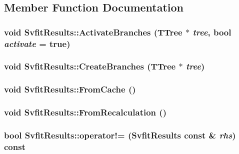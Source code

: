 \subsection{Member Function Documentation}
\hypertarget{classSvfitResults_aa0a9d6018105c2c242239e66d0af4a51}{
\subsubsection[{ActivateBranches}]{\setlength{\rightskip}{0pt plus 5cm}void SvfitResults::ActivateBranches (TTree $\ast$ {\em tree}, \/  bool {\em activate} = {\ttfamily true})}}
\label{classSvfitResults_aa0a9d6018105c2c242239e66d0af4a51}
\hypertarget{classSvfitResults_ad4822dc697bd45db7b7aa76c00ebd8e1}{
\subsubsection[{CreateBranches}]{\setlength{\rightskip}{0pt plus 5cm}void SvfitResults::CreateBranches (TTree $\ast$ {\em tree})}}
\label{classSvfitResults_ad4822dc697bd45db7b7aa76c00ebd8e1}
\hypertarget{classSvfitResults_aa2dfd4bb75cdb81445d4a7f12ff13765}{
\subsubsection[{FromCache}]{\setlength{\rightskip}{0pt plus 5cm}void SvfitResults::FromCache ()}}
\label{classSvfitResults_aa2dfd4bb75cdb81445d4a7f12ff13765}
\hypertarget{classSvfitResults_a57b084ba9986fcfe3709ae0f28c0d418}{
\subsubsection[{FromRecalculation}]{\setlength{\rightskip}{0pt plus 5cm}void SvfitResults::FromRecalculation ()}}
\label{classSvfitResults_a57b084ba9986fcfe3709ae0f28c0d418}
\hypertarget{classSvfitResults_ad041804809054ef7c2646c60917ba4df}{
\subsubsection[{operator!=}]{\setlength{\rightskip}{0pt plus 5cm}bool SvfitResults::operator!= ({\bf SvfitResults} const \& {\em rhs}) const}}
